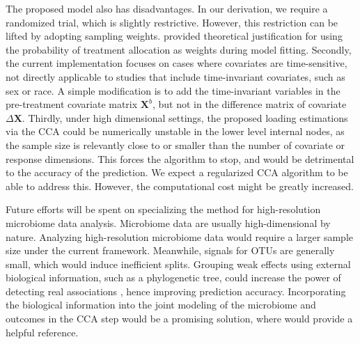 \documentclass[smallextended]{svjour3}
\newcommand{\bg}[1]{\textcolor{red}{#1}}
\begin{document}
The proposed model also has disadvantages. In our derivation, we require a randomized trial, which is slightly restrictive. However, this restriction can be lifted by adopting sampling weights. \cite{tian2014simple} provided theoretical justification for using the probability of treatment allocation as weights during model fitting. Secondly, the current implementation focuses on cases where covariates are time-sensitive, not directly applicable to studies that include time-invariant covariates, such as sex or race. A simple modification is to add the time-invariant variables in the pre-treatment covariate matrix $\textbf{X}^b$, but not in the difference matrix of covariate $\Delta \textbf{X}$. Thirdly, under high dimensional settings, the proposed loading estimations via the CCA could be numerically unstable in the lower level internal nodes, as the sample size is relevantly close to or smaller than the number of covariate or response dimensions. This forces the algorithm to stop, and would be detrimental to the accuracy of the prediction. We expect a regularized CCA algorithm to be able to address this. However, the computational cost might be greatly increased. %

Future efforts will be spent on specializing the method for high-resolution microbiome data analysis. Microbiome data are usually high-dimensional by nature. Analyzing high-resolution microbiome data would require a larger sample size under the current framework. Meanwhile, signals for OTUs are generally small, which would induce inefficient splits. Grouping weak effects using external biological information, such as a phylogenetic tree, could increase the power of detecting real associations \citep{peterson2016joint}, hence improving prediction accuracy. Incorporating the biological information into the joint modeling of the microbiome and outcomes in the CCA step would be a promising solution, where \citet{chen2013structure} would provide a helpful reference. 

\end{document}
